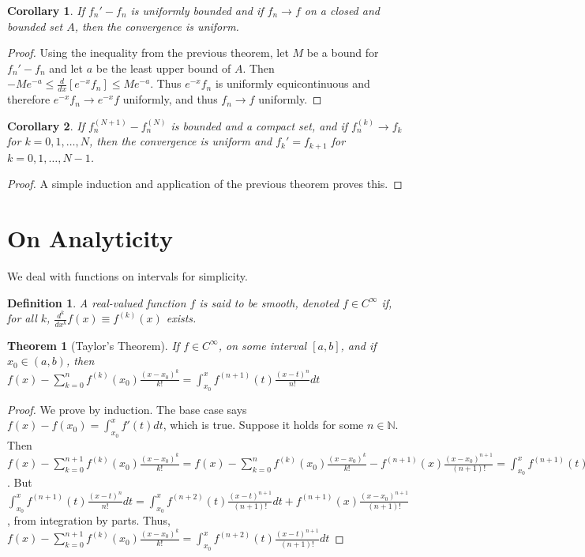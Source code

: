 \documentclass[12pt,oneside]{book}
\theoremstyle{mystyle}
\newtheorem{theorem}{Theorem}[section]
\newtheorem{definition}{Definition}[section]
\newtheorem{corollary}{Corollary}[section]
\begin{document}
\begin{corollary}
If $f_n' - f_n$ is uniformly bounded and if $f_n \rightarrow f$ on a closed and bounded set $A$, then the convergence is uniform.
\end{corollary}
\begin{proof}
Using the inequality from the previous theorem, let $M$ be a bound for $f_n'-f_n$ and let $a$ be the least upper bound of $A$. Then $-Me^{-a}\leq \frac{d}{dx}[e^{-x}f_n] \leq Me^{-a}$. Thus $e^{-x}f_n$ is uniformly equicontinuous and therefore $e^{-x}f_n\rightarrow e^{-x}f$ uniformly, and thus $f_n\rightarrow f$ uniformly.
\end{proof}

\begin{corollary}
If $f_n^{(N+1)}-f_n^{(N)}$ is bounded and a compact set, and if $f_n^{(k)}\rightarrow f_k$ for $k=0,1,\hdots, N$, then the convergence is uniform and $f_{k}' = f_{k+1}$ for $k=0,1,\hdots,N-1$.
\end{corollary}
\begin{proof}
A simple induction and application of the previous theorem proves this.
\end{proof}
%
\section{On Analyticity}
%
We deal with functions on intervals for simplicity.
%
\begin{definition}
A real-valued function $f$ is said to be smooth, denoted $f\in C^{\infty}$ if, for all $k$, $\frac{d^k}{dx^k}f(x) \equiv f^{(k)}(x)$ exists.
\end{definition}

\begin{theorem}[Taylor's Theorem]
If $f\in C^{\infty}$, on some interval $[a,b]$, and if $x_0\in (a,b)$, then $f(x) - \sum_{k=0}^{n} f^{(k)}(x_0)\frac{(x-x_0)^k}{k!} = \int_{x_0}^{x} f^{(n+1)}(t)\frac{(x-t)^n}{n!}dt$
\end{theorem}
\begin{proof}
We prove by induction. The base case says $f(x)-f(x_0) = \int_{x_0}^{x} f'(t)dt$, which is true. Suppose it holds for some $n\in \mathbb{N}$. Then $f(x)-\sum_{k=0}^{n+1} f^{(k)}(x_0)\frac{(x-x_0)^k}{k!} = f(x)-\sum_{k=0}^{n} f^{(k)}(x_0)\frac{(x-x_0)^k}{k!} - f^{(n+1)}(x)\frac{(x-x_0)^{n+1}}{(n+1)!} = \int_{x_0}^{x} f^{(n+1)}(t)\frac{(x-t)^n}{n!}dt - f^{(n+1)}(x)\frac{(x-x_0)^{n+1}}{(n+1)!}$. But $\int_{x_0}^{x} f^{(n+1)}(t)\frac{(x-t)^n}{n!}dt =  \int_{x_0}^{x} f^{(n+2)}(t) \frac{(x-t)^{n+1}}{(n+1)!} dt + f^{(n+1)}(x)\frac{(x-x_0)^{n+1}}{(n+1)!}$, from integration by parts. Thus, $f(x)-\sum_{k=0}^{n+1} f^{(k)}(x_0)\frac{(x-x_0)^k}{k!}= \int_{x_0}^{x} f^{(n+2)}(t) \frac{(x-t)^{n+1}}{(n+1)!} dt$
\end{proof}
\end{document}
